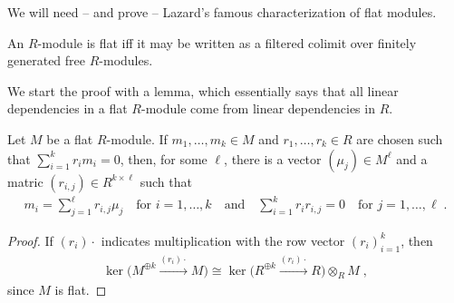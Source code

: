 \documentclass[a4paper,parskip=half,numbers=enddot, DIV=12]{scrreprt}
\begin{document}
We will need -- and prove -- Lazard's famous characterization of flat modules.
\begin{prop}[Lazard]
	An $R$-module is flat iff it may be written as a filtered colimit over finitely generated free $R$-modules.
\end{prop}
We start the proof with a lemma, which essentially says that all linear dependencies in a flat $R$-module come from linear dependencies in $R$.
\begin{lem}
	Let $M$ be a flat $R$-module. If $m_1,\ldots, m_k\in M$ and $r_1,\ldots,r_k\in R$ are chosen such that $\sum_{i=1}^kr_im_i=0$, then, for some $\ell$, there is a vector $(\mu_j)\in M^{\ell}$ and a matric $(r_{i,j})\in R^{k\times \ell}$ such that
	\begin{align*}
		m_i=\sum_{j=1}^\ell r_{i,j}\mu_j\quad\text{for }i=1,\ldots,k\quad\text{and}\quad \sum_{i=1}^kr_ir_{i,j}=0\quad\text{for }j=1,\ldots,\ell\;.
	\end{align*}
\end{lem}
\begin{proof}
	If $(r_i)\cdot $ indicates multiplication with the row vector $(r_i)_{i=1}^k$, then
	\begin{align*}
		\ker\Big(M^{\oplus k}\xrightarrow{(r_i)\cdot }M\Big)\cong \ker\Big(R^{\oplus k}\xrightarrow{(r_i)\cdot }R\Big)\otimes_RM\;,
	\end{align*}
	since $M$ is flat.
\end{proof}
\end{document}
